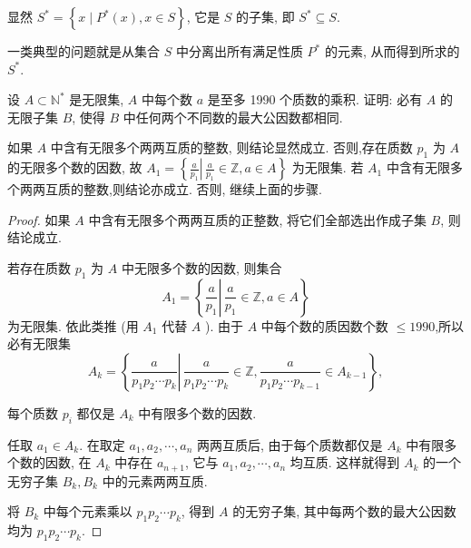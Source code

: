 显然 $S^{*}=\left\{x \mid P^{*}(x), x \in S\right\}$, 它是 $S$ 的子集, 即 $S^{*} \subseteq S$.

一类典型的问题就是从集合 $S$ 中分离出所有满足性质 $P^{*}$ 的元素, 从而得到所求的 $S^{*}$.

\begin{example}
	设 $A \subset \mathbb{N}^{*}$ 是无限集, $A$ 中每个数 $a$ 是至多 1990 个质数的乘积. 证明: 必有 $A$ 的无限子集 $B$, 使得 $B$ 中任何两个不同数的最大公因数都相同.
\end{example}
\begin{analysis}
	如果 $A$ 中含有无限多个两两互质的整数, 则结论显然成立. 否则,存在质数 $p_{1}$ 为 $A$ 的无限多个数的因数, 故 $A_{1}=\left\{\frac{a}{p_{1}} \left\lvert\, \frac{a}{p_{1}} \in \mathbb{Z}\right., a \in A\right\}$ 为无限集. 若 $A_{1}$ 中含有无限多个两两互质的整数,则结论亦成立. 否则, 继续上面的步骤.
\end{analysis}
\begin{proof}
	如果 $A$ 中含有无限多个两两互质的正整数, 将它们全部选出作成子集 $B$, 则结论成立.

	若存在质数 $p_{1}$ 为 $A$ 中无限多个数的因数, 则集合
	$$
		A_{1}=\left\{\frac{a}{p_{1}} \left\lvert\, \frac{a}{p_{1}} \in \mathbb{Z}\right., a \in A\right\}
	$$
	为无限集. 依此类推 (用 $A_{1}$ 代替 $A$ ). 由于 $A$ 中每个数的质因数个数 $\leqslant 1990$,所以必有无限集
	$$
		A_{k}=\left\{\frac{a}{p_{1} p_{2} \cdots p_{k}} \left\lvert\, \frac{a}{p_{1} p_{2} \cdots p_{k}} \in \mathbb{Z}\right., \frac{a}{p_{1} p_{2} \cdots p_{k-1}} \in A_{k-1}\right\},
	$$

	每个质数 $p_{i}$ 都仅是 $A_{k}$ 中有限多个数的因数.

	任取 $a_{1} \in A_{k}$. 在取定 $a_{1}, a_{2}, \cdots, a_{n}$ 两两互质后, 由于每个质数都仅是 $A_{k}$ 中有限多个数的因数, 在 $A_{k}$ 中存在 $a_{n+1}$, 它与 $a_{1}, a_{2}, \cdots, a_{n}$ 均互质. 这样就得到 $A_{k}$ 的一个无穷子集 $B_{k}, B_{k}$ 中的元素两两互质.

	将 $B_{k}$ 中每个元素乘以 $p_{1} p_{2} \cdots p_{k}$, 得到 $A$ 的无穷子集, 其中每两个数的最大公因数均为 $p_{1} p_{2} \cdots p_{k}$.
\end{proof}

